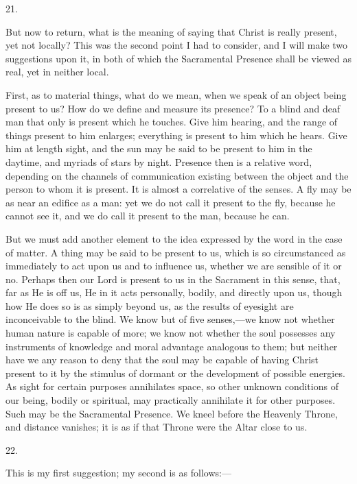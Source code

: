21.

But now to return, what is the meaning of saying
that Christ is really present, yet not locally? This was the second
point I had to consider, and I will make two suggestions upon it, in
both of which the Sacramental Presence shall be viewed as real, yet in
neither local.

First, as to material things, what do we mean,
when we speak of an object being present to us? How do we define and
measure its presence? To a blind and deaf man that only is present
which he touches. Give him hearing, and the range of things present to
him enlarges; everything is present to him which he hears. Give him at
length sight, and the sun may be said to be present to him in the
daytime, and myriads of stars by night. Presence then is a relative
word, depending on the channels of communication existing between the
object and the person to whom it is present. It is almost a
correlative of the senses. A fly may be as near an edifice as a man:
yet we do not call it present to the fly, because he cannot see it,
and we do call it present to the man, because he can.

But we must add another element to the idea
expressed by the word in the case of matter. A thing may be said to be
present to us, which is so circumstanced as immediately to act upon us
and to influence us, whether we are sensible of it or no. Perhaps then
our Lord is present to us in the Sacrament in this sense, that, far as
He is off us, He in it acts personally, bodily, and directly upon us,
though how He does so is as simply beyond us, as the results of
eyesight are inconceivable to the blind. We know but of five
senses,—we know not whether human nature is capable of more; we know
not whether the soul possesses any instruments of knowledge and moral
advantage analogous to them; but neither have we any reason to deny
that the soul may be capable of having Christ present to it by the
stimulus of dormant or the development of possible energies. As sight
for certain purposes annihilates space, so other unknown conditions of
our being, bodily or spiritual, may practically annihilate it for
other purposes. Such may be the Sacramental Presence. We kneel before
the Heavenly Throne, and distance vanishes; it is as if that Throne
were the Altar close to us.

22.

This is my first suggestion; my second is as
follows:—

